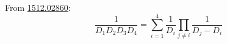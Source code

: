 \documentclass{article}
\title{}
\author{}
\date{}
\numberwithin{equation}{section}
\begin{document}
	\tableofcontents
	\maketitle
From \href{https://arxiv.org/pdf/1512.02860.pdf}{1512.02860}: 
\begin{equation}
	\frac{1}{D_1D_2D_3D_4}=\sum_{i=1}^{4}\frac{1}{D_i}\prod_{j\ne i}\frac{1}{D_j-D_i}
\end{equation}

	
\end{document}
